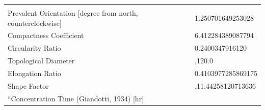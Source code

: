 \documentclass[11pt,]{article}
\begin{document}
\begin{longtable}[]{@{}ll@{}}
\begin{minipage}[t]{0.28\columnwidth}
\end{minipage}\tabularnewline
\begin{minipage}[t]{0.66\columnwidth}\raggedright\strut
Prevalent Orientation {[}degree from north, counterclockwise{]}\strut
\end{minipage} & \begin{minipage}[t]{0.28\columnwidth}\raggedright\strut
1.250701649253028\strut
\end{minipage}\tabularnewline
\begin{minipage}[t]{0.66\columnwidth}\raggedright\strut
Compactness Coefficient\strut
\end{minipage} & \begin{minipage}[t]{0.28\columnwidth}\raggedright\strut
6.412284389087794\strut
\end{minipage}\tabularnewline
\begin{minipage}[t]{0.66\columnwidth}\raggedright\strut
Circularity Ratio\strut
\end{minipage} & \begin{minipage}[t]{0.28\columnwidth}\raggedright\strut
0.2400347916120\strut
\end{minipage}\tabularnewline
\begin{minipage}[t]{0.66\columnwidth}\raggedright\strut
Topological Diameter\strut
\end{minipage} & \begin{minipage}[t]{0.28\columnwidth}\raggedright\strut
,120.0\strut
\end{minipage}\tabularnewline
\begin{minipage}[t]{0.66\columnwidth}\raggedright\strut
Elongation Ratio\strut
\end{minipage} & \begin{minipage}[t]{0.28\columnwidth}\raggedright\strut
0.4103977285869175\strut
\end{minipage}\tabularnewline
\begin{minipage}[t]{0.66\columnwidth}\raggedright\strut
Shape Factor\strut
\end{minipage} & \begin{minipage}[t]{0.28\columnwidth}\raggedright\strut
,11.44258120713636\strut
\end{minipage}\tabularnewline
\begin{minipage}[t]{0.66\columnwidth}\raggedright\strut
``Concentration Time (Giandotti, 1934) {[}hr{]}\strut
\end{minipage} & \begin{minipage}[t]{0.28\columnwidth}\raggedright\strut

\end{minipage}
\end{longtable}
\end{document}
